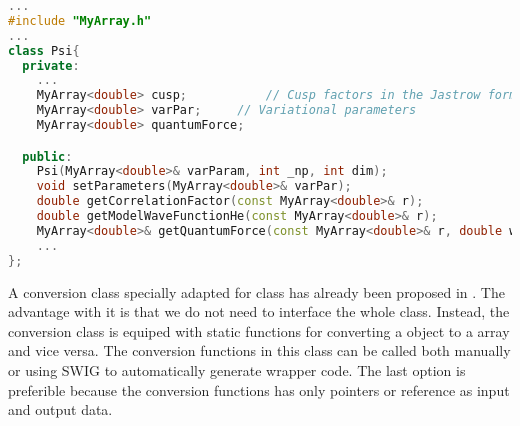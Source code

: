 \begin{lstlisting}[language=c++]
...
#include "MyArray.h"
...
class Psi{
  private:
    ...
    MyArray<double> cusp;			// Cusp factors in the Jastrow form
    MyArray<double> varPar;		// Variational parameters
    MyArray<double> quantumForce;	

  public:
    Psi(MyArray<double>& varParam, int _np, int dim);
    void setParameters(MyArray<double>& varPar);
    double getCorrelationFactor(const MyArray<double>& r);
    double getModelWaveFunctionHe(const MyArray<double>& r);
    MyArray<double>& getQuantumForce(const MyArray<double>& r, double wf);
    ...
}; 
\end{lstlisting}
\noindent
A conversion class  specially adapted for  class has already been proposed in \cite{HPL}. The advantage with it is that we do not need to interface the whole  class. Instead, the conversion class is equiped with static functions for converting a  object to a  array and vice versa. The conversion functions in this class can be called both manually or using SWIG to automatically generate wrapper code. The last option is preferible because the conversion functions has only pointers or reference as input and output data.

